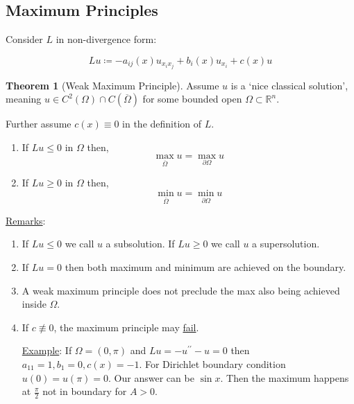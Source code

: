 \documentclass{article}
\theoremstyle{definition}
\newtheorem{theorem}{Theorem}
\begin{document}
\subsection*{Maximum Principles}

Consider \(L\) in non-divergence form:

\[
    Lu \coloneqq -a_{ij}(x) u_{x_i x_j} + b_i(x) u_{x_i} + c(x)u 
\]

\begin{theorem}
    [Weak Maximum Principle] Assume \(u\) is a `nice classical solution', meaning \(u\in C^2(\Omega)\cap C(\overline{\Omega})\) for some bounded open \(\Omega \subset \mathbb{R}^n\).
    
    Further assume \(c(x)\equiv 0\) in the definition of \(L\).

    \begin{enumerate}[label=\roman*)]
        \item If \(Lu \leq 0\) in \(\Omega\) then,
        \[
            \max_{\overline{\Omega}} u = \max_{\partial \Omega} u
        \]
        \item If \(Lu \geq 0\) in \(\Omega\) then,
        \[
            \min_{\overline{\Omega}} u = \min_{\partial \Omega} u
        \]
    \end{enumerate} 
\end{theorem}

\underline{Remarks}:

\begin{enumerate}[label=\arabic*)]
    \item  If \(L u \leq 0\) we call \(u\) a subsolution. If \(Lu \geq 0\) we call \(u\) a supersolution.

    \item If \(Lu = 0\) then both maximum and minimum are achieved on the boundary.

    \item A weak maximum principle does not preclude the max also being achieved inside \(\Omega\).
    
    \item If \(c\not\equiv 0\), the maximum principle may \underline{fail}.
    
    \underline{Example}: If \(\Omega = (0,\pi)\) and \(Lu = -u^{\prime\prime} - u = 0\) then \(a_{11} = 1, b_1 = 0, c(x)=-1\). For Dirichlet boundary condition \(u(0)=u(\pi)=0\). Our answer can be \(\sin x\). Then the maximum happens at \(\frac{\pi}{2}\) not in boundary for \(A > 0\). 

\end{enumerate}
\end{document}
